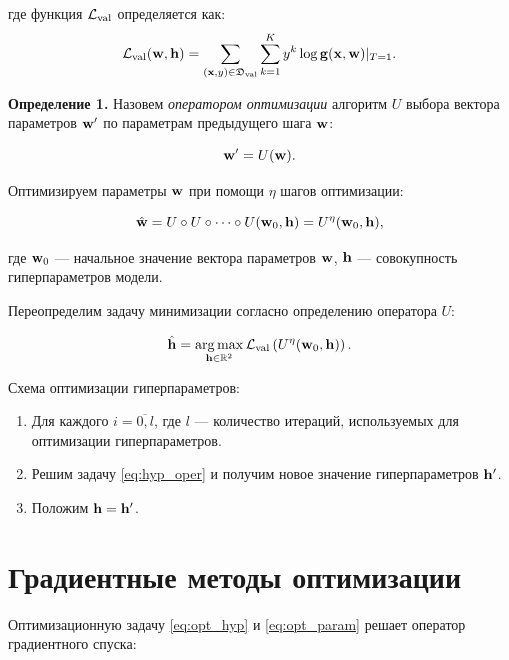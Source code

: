 \documentclass[12pt, twoside]{article}
\begin{document}
\noindent
где функция $\mathcal{L}_\text{val}$ определяется как: 
 \begin{equation} \label{eq:l_val}
     \cL_\text{val}(\bw, \bh) = \sum\limits_{(\bx, y) \in \fD_\text{val}}\sum\limits_{k=1}^{K}y^k\log \bg(\bx, \bw)|_{T=1}.
 \end{equation}

\textbf{Определение 1.} Назовем \emph{оператором оптимизации} алгоритм $U$ выбора вектора параметров $\mathbf{w}^\prime$ по параметрам предыдущего шага $\mathbf{w}$:

\begin{equation*}
    \mathbf{w}^\prime = U(\mathbf{w}).
\end{equation*}

Оптимизируем параметры $\mathbf{w}$ при помощи $\eta$ шагов оптимизации:

\begin{equation} \label{eq:oper_superp}
    \hat{\bw} = U \circ U \circ \dots \circ U(\bw_0, \bh) = U^\eta(\bw_0, \bh),
\end{equation}

\noindent
где $\mathbf{w}_0$ --- начальное значение вектора параметров $\mathbf{w}$, $\mathbf{h}$ --- совокупность гиперпараметров модели.

Переопределим задачу минимизации согласно определению оператора $U$:

\begin{equation} \label{eq:hyp_oper}
    \hat{\bh} = \argmax\limits_{\bh \in \bbR^2} \cL_\text{val}\left(U^\eta(\bw_0, \bh)\right).
\end{equation}

Схема оптимизации гиперпараметров:

\begin{enumerate}
    \item Для каждого $i = \overline{0, l}$, где $l$ --- количество итераций, используемых для оптимизации гиперпараметров.
    \item Решим задачу \eqref{eq:hyp_oper} и получим новое значение гиперпараметров $\mathbf{h}^\prime$.
    \item Положим $\mathbf{h} = \mathbf{h}^\prime$.
\end{enumerate}

\section{Градиентные методы оптимизации}

Оптимизационную задачу \eqref{eq:opt_hyp} и \eqref{eq:opt_param} решает оператор градиентного спуска:
\end{document}
